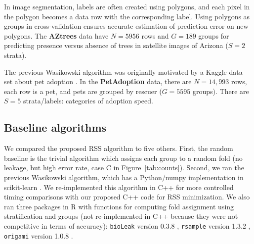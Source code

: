 \documentclass[twoside]{article}
\begin{document}
In image segmentation, labels are often created using polygons, and each pixel in the polygon becomes a data row with the corresponding label.
Using polygons as groups in cross-validation ensures accurate estimation of prediction error on new polygons.
The \textbf{AZtrees} data have $N=5956$ rows and $G=189$ groups for predicting presence versus absence of trees in satellite images of Arizona \citep{Hocking2026soak} ($S=2$ strata).

The previous Wasikowski algorithm was originally motivated by a Kaggle data set about pet adoption \citep{Wasikowski2019}.
In the \textbf{PetAdoption} data, there are $N=14,993$ rows, each row is a pet, and pets are grouped by rescuer ($G=5595$ groups).
There are $S=5$ strata/labels: categories of adoption speed.

\subsection{Baseline algorithms}

We compared the proposed RSS algorithm to five others.
First, the random baseline is the trivial algorithm which assigns each group to a random fold (no leakage, but high error rate, case C in Figure~\ref{tab:counts}).
Second, we ran the previous Wasikowski algorithm, which has a Python/numpy implementation in scikit-learn \citep{sklearn2011}.
We re-implemented this algorithm in C++ for more controlled timing comparisons with our proposed C++ code for RSS minimization.
We also ran three packages in R \citep{R2026} with functions for computing fold assignment using stratification and groups (not re-implemented in C++ because they were not competitive in terms of accuracy): 
\texttt{bioLeak} version 0.3.8 \citep{bioLeak2026}, \texttt{rsample} version 1.3.2 \citep{rsample2026}, \texttt{origami} version 1.0.8 \citep{Coyle2018,origami2026}.
\end{document}
